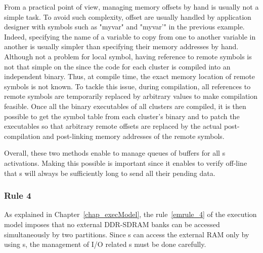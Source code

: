 \documentclass[main.tex]{subfiles}
\begin{document}
\begin{description}
        From a practical point of view, managing memory offsets by hand is
        usually not a simple task. To avoid such complexity, offset are usually
        handled by application designer with symbols such as "myvar" and
        "myvar'" in the previous example. Indeed, specifying the name of a
        variable to copy from one \PN{} to another variable in another \PN{} is
        usually simpler than specifying their memory addresses by hand.
        Although not a problem for local symbol, having reference to remote
        symbols is not that simple on the \mppalong since the code for each
        cluster is compiled into an independent binary. Thus, at compile time,
        the exact memory location of remote symbols is not known. To tackle
        this issue, during compilation, all references to remote symbols are
        temporarily replaced by arbitrary values to make compilation feasible.
        Once all the binary executables of all clusters are compiled, it is
        then possible to get the symbol table from each cluster's binary and to
        patch the executables so that arbitrary remote offsets are replaced by
        the actual post-compilation and post-linking memory addresses of the
        remote symbols. 
\end{description}

Overall, these two methods enable to manage queues of buffers for all \PC{}s
activations. Making this possible is important since it enables to verify
off-line that \PC{}s will always be sufficiently long to send all their pending
data.

\subsubsection{Rule 4} As explained in Chapter~\ref{chap_execModel}, the
rule~\ref{emrule_4} of the execution model imposes that no external DDR-SDRAM
banks can be accessed simultaneously by two partitions. Since \PN{}s can access
the external RAM only by using \PC{}s, the management of I/O related \PC{}s
must be done carefully.
\end{document}
